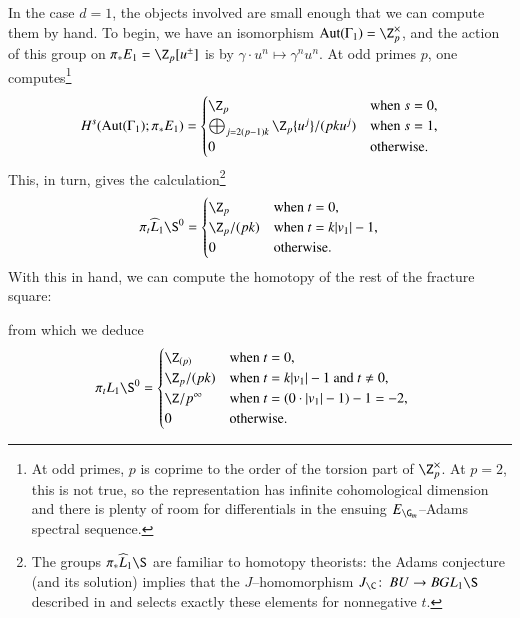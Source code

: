 \begin{example}\label{piLK1SExample}
In the case $d = 1$, the objects involved are small enough that we can compute them by hand.  To begin, we have an isomorphism $\operatorname{Aut}(\Gamma_1) = \Z_p^\times$, and the action of this group on $\pi_* E_1 = \Z_p[u^\pm]$ is by $\gamma \cdot u^n \mapsto \gamma^n u^n$.  At odd primes $p$, one computes\footnote{At odd primes, $p$ is coprime to the order of the torsion part of $\Z_p^\times$.  At $p = 2$, this is not true, so the representation has infinite cohomological dimension and there is plenty of room for differentials in the ensuing $E_{\G_m}$--Adams spectral sequence.} \[H^s(\operatorname{Aut}(\Gamma_1); \pi_* E_1) = \begin{cases}\Z_p & \text{when $s = 0$}, \\ \bigoplus_{j = 2(p-1)k} \Z_p\{u^j\} / (pk u^j) & \text{when $s = 1$}, \\ 0 & \text{otherwise}. \end{cases}\]  This, in turn, gives the calculation\footnote{The groups $\pi_* \widehat L_1 \S$ are familiar to homotopy theorists: the Adams conjecture~\cite{AdamsJXIV} (and its solution) implies that the $J$--homomorphism $J_{\C}\co BU \to BGL_1 \S$ described in  and  selects exactly these elements for nonnegative $t$.}
\[
\pi_t \widehat L_1 \S^0 = \begin{cases} \Z_p & \text{when $t = 0$}, \\ \Z_p / (pk) & \text{when $t = k|v_1| - 1$}, \\ 0 & \text{otherwise}. \end{cases}
\]
With this in hand, we can compute the homotopy of the rest of the fracture square:
\begin{center}
\end{center}
from which we deduce
\begin{align*}
\pi_t L_1 \S^0 & = \begin{cases} \Z_{(p)} & \text{when $t = 0$}, \\ \Z_p / (pk) & \text{when $t = k|v_1| - 1$ and $t \ne 0$}, \\ \Z/p^\infty & \text{when $t = (0 \cdot |v_1| - 1) - 1 = -2$}, \\ 0 & \text{otherwise}. \end{cases}
\end{align*}
\end{example}

